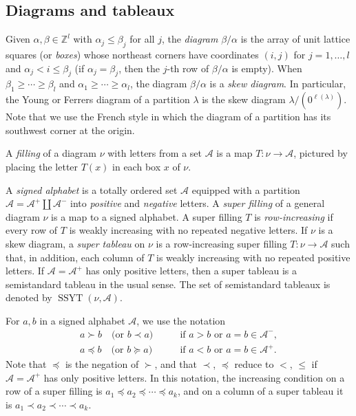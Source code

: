 \documentclass[12pt]{amsart}
\theoremstyle{definition}
\theoremstyle{remark}
\newcommand{\Acal}{{\mathcal A}}
\newcommand{\sgngt}{\succ}
\newcommand{\sgnlt}{\prec}
\newcommand{\sgnle}{\preccurlyeq}
\newcommand{\sgnge}{\succcurlyeq}
\DeclareMathOperator{\SSYT}{SSYT}
\begin{document}
\subsection{Diagrams and tableaux} \label{ss:diagrams}

Given $\alpha,\beta\in\mathbb Z^l$ with $\alpha_{j} \leq \beta_{j}$
for all $j$, the {\it diagram} $\beta/\alpha$ is the array of unit
lattice squares (or {\em boxes}) whose northeast corners have
coordinates $(i,j)$ for $j=1,\ldots,l$ and $\alpha _{j}< i\leq \beta
_{j}$ (if $\alpha _{j} = \beta _{j}$, then the $j$-th row of $\beta
/\alpha $ is empty).  When $\beta_1\geq \cdots\geq\beta_{l}$ and
$\alpha_1\geq \cdots \geq \alpha_{l}$, the diagram $\beta/\alpha$ is a
{\it skew diagram}.  In particular, the Young or Ferrers diagram of a
partition $\lambda $ is the skew diagram $\lambda /(0^{\ell (\lambda
)})$.  Note that we use the French style in which the diagram of a
partition has its southwest corner at the origin.

A {\em filling} of a diagram $\nu$ with letters from a set $\Acal $ is
a map $T\colon \nu \rightarrow \Acal $, pictured by placing the letter
$T(x)$ in each box $x$ of $\nu $.

A {\em signed alphabet} is a totally ordered set $\Acal $ equipped
with a partition $\Acal =\Acal ^{+}\coprod \Acal ^{-}$ into {\em
positive} and {\em negative} letters.  A {\em super filling} of a
general diagram $\nu $ is a map to a signed alphabet.  A super filling
$T$ is {\em row-increasing} if every row of $T$ is weakly increasing
with no repeated negative letters.  If $\nu $ is a skew diagram, a
{\em super tableau} on $\nu$ is a row-increasing super filling
$T\colon \nu \rightarrow \Acal $ such that, in addition, each column
of $T$ is weakly increasing with no repeated positive letters.  If
$\Acal =\Acal ^{+}$ has only positive letters, then a super tableau is
a semistandard tableau in the usual sense. The set of semistandard
tableaux is denoted by $\SSYT(\nu,\Acal)$.

For $a,b$ in a signed alphabet $\Acal $, we use the notation
\begin{equation}\label{e:inv-signed}
\begin{aligned}
a \sgngt b \quad \text{(or $b \sgnlt a$)}& \qquad \text{if $a>b$ or
 $a=b\in \Acal ^{-}$},\\
a \sgnle b \quad \text{(or $b \sgnge a$)}& \qquad \text{if $a<b$ or
 $a=b\in \Acal ^{+}$}.
\end{aligned}
\end{equation}
Note that $\sgnle $ is the negation of $\sgngt $, and that $\sgnlt $,
$\sgnle $ reduce to $<$, $\leq $ if $\Acal = \Acal ^{+}$ has only
positive letters.  In this notation, the increasing condition on a row
of a super filling is $a_1 \sgnle a_2 \sgnle \cdots \sgnle a_k$, and
on a column of a super tableau it is $a_1 \sgnlt a_2 \sgnlt \cdots
\sgnlt a_k$.
\end{document}
